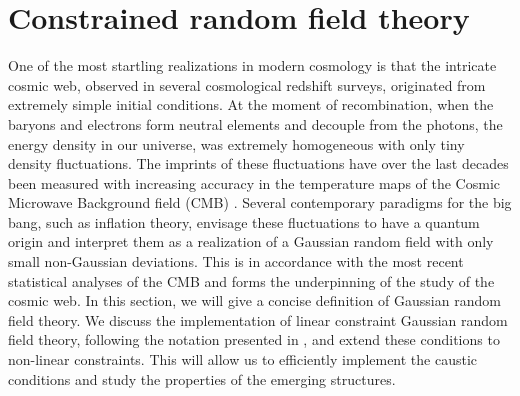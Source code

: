 \documentclass[a4paper, 11pt]{article}
\begin{document}
\section{Constrained random field theory}\label{sec:GRF}
One of the most startling realizations in modern cosmology is that the intricate cosmic web, observed in several cosmological redshift surveys, originated from extremely simple initial conditions. At the moment of recombination, when the baryons and electrons form neutral elements and decouple from the photons, the energy density in our universe, was extremely homogeneous with only tiny density fluctuations. The imprints of these fluctuations have over the last decades been measured with increasing accuracy in the temperature maps of the Cosmic Microwave Background field (CMB) \cite{WMAP:2003, Planck:2016}. Several contemporary paradigms for the big bang, such as inflation theory, envisage these fluctuations to have a quantum origin and interpret them as a realization of a Gaussian random field with only small non-Gaussian deviations. This is in accordance with the most recent statistical analyses of the CMB \cite {Creminelli:2006, Planck:2020} and forms the underpinning of the study of the cosmic web. In this section, we will give a concise definition of Gaussian random field theory. We discuss the implementation of linear constraint Gaussian random field theory, following the notation presented in \cite{Weygaert:1996}, and extend these conditions to non-linear constraints. This will allow us to efficiently implement the caustic conditions and study the properties of the emerging structures.
\end{document}
